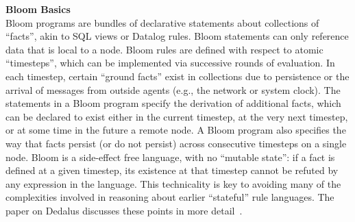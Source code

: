 \noindent\textbf{Bloom Basics}\\
\noindent
Bloom programs are bundles of declarative statements about collections of ``facts'', akin to SQL views or Datalog rules.  Bloom statements can only reference data that is local to a node.  Bloom rules are defined with respect to atomic ``timesteps'', which can be implemented via successive rounds of evaluation. In each timestep, certain ``ground facts'' exist in collections due to persistence or the arrival of messages from outside agents (e.g., the network or system clock).  The statements in a Bloom program specify the derivation of additional facts, which can be declared to exist either in the current timestep, at the very next timestep, or at some time in the future a remote node.  A Bloom program also specifies the way that facts persist (or do not persist) across consecutive timesteps on a single node.  Bloom is a side-effect free language, with no ``mutable state'': if a fact is defined at a given timestep, its existence at that timestep cannot be refuted by any expression in the language.  This technicality is key to avoiding many of the complexities involved in reasoning about earlier ``stateful'' rule languages.  The paper on Dedalus discusses these points in more detail~\cite{dedalus-techr}.

